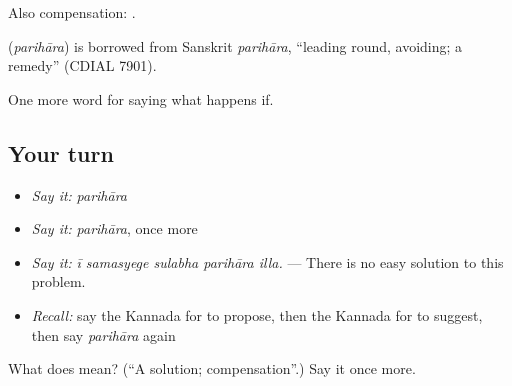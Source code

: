 Also compensation:   .

\begin{cousinweb}
\textbf{} (\emph{parihāra}) is borrowed from Sanskrit \emph{parihāra}, \textquotedblleft{}leading round, avoiding; a remedy\textquotedblright{} (CDIAL 7901).
\end{cousinweb}

\begin{grammarlens}[title={What you've built}]
One more word for saying what happens if.
\end{grammarlens}

\subsection*{Your turn}
\begin{itemize}
\raggedright
  \item \emph{Say it:} \emph{parihāra}
  \item \emph{Say it:} \emph{parihāra}, once more
  \item \emph{Say it:} \emph{ī samasyege sulabha parihāra illa.} — There is no easy solution to this problem.
  \item \emph{Recall:} say the Kannada for to propose, then the Kannada for to suggest, then say \emph{parihāra} again
\end{itemize}

\begin{tcolorbox}[breakable,colback=teal!4,colframe=teal!35!black,title={Before you move on}]
What does  mean? (\textquotedblleft{}A solution; compensation\textquotedblright{}.) Say it once more.
\end{tcolorbox}
